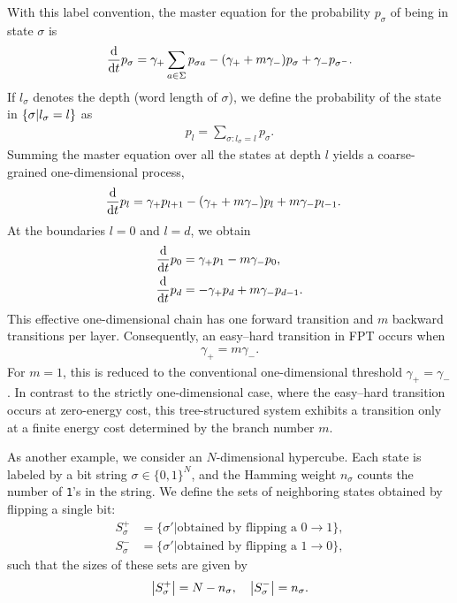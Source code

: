 \documentclass[%
 reprint,
superscriptaddress,
 amsmath,amssymb,
 aps,
 prx,
]{revtex4-2}
\begin{document}
With this label convention, the master equation for the probability $p_\sigma$ of being in state $\sigma$ is 
\begin{gather}
    \dv{t} p_\sigma = \gamma_+ \sum_{a\in\Sigma}p_{\sigma a} - (\gamma_+ + m \gamma_-) p_\sigma + \gamma_- p_{\sigma^-}. 
\end{gather}
If $l_\sigma$ denotes the depth (word length of $\sigma$), we define the probability of the state in $\qty{\sigma| l_\sigma = l}$ as 
\begin{align}
    p_l = \sum_{\sigma: l_\sigma=l} p_\sigma.
\end{align}
Summing the master equation over all the states at depth $l$ yields a coarse-grained one-dimensional process, 
\begin{align}
    \dv{t} p_l &= \gamma_{+} p_{l+1} -(\gamma_{+}+m\gamma_{-})p_l + m\gamma_{-} p_{l-1}. 
\end{align}
At the boundaries $l=0$ and $l=d$, we obtain
\begin{align}
\dv{t}p_0 & = \gamma_{+}p_1-m\gamma_{-}p_0, \\
\dv{t}p_d & = -\gamma_{+}p_d+m\gamma_{-}p_{d-1}.
\end{align}
This effective one-dimensional chain has one forward transition and $m$ backward transitions per layer. 
Consequently, an easy--hard transition in FPT occurs when
\begin{align*}
    \gamma_+=m\gamma_-. 
\end{align*}
For $m=1$, this is reduced to the conventional one-dimensional threshold $\gamma_+=\gamma_-$. 
In contrast to the strictly one-dimensional case, where the easy--hard transition occurs at zero-energy cost, this tree-structured system exhibits a transition only at a finite energy cost determined by the branch number $m$. 

As another example, we consider an $N$-dimensional hypercube. Each state is labeled by a bit string $\sigma\in\{0,1\}^N$, and the Hamming weight $n_\sigma$ counts the number of \texttt{1}'s in the string. 
We define the sets of neighboring states obtained by flipping a single bit:
\begin{align*}
    S_\sigma^{+} &= \{\sigma' | \text{obtained by flipping a }0\to 1\}, \\
    S_\sigma^{-} &= \{\sigma' | \text{obtained by flipping a }1\to 0\}, 
\end{align*}
such that the sizes of these sets are given by 
\begin{align*}
    \abs{S_\sigma^+} = N - n_\sigma, \quad \abs{S_\sigma^-} = n_\sigma. 
\end{align*}
\end{document}
